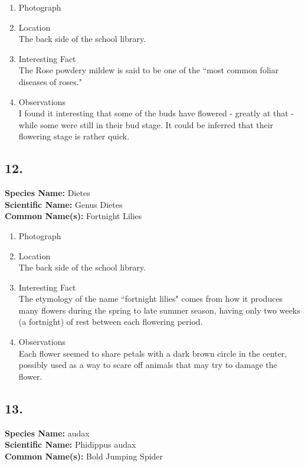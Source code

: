 \documentclass{article}
\begin{document}
\begin{enumerate}[label = \textbf{\arabic*)}]
	\item Photograph

	\item Location \\
		The back side of the school library.
	\item Interesting Fact \\
		The Rose powdery mildew is said to be one of the ``most common foliar diseases of roses."
	\item Observations \\
		I found it interesting that some of the buds have flowered - greatly at that - while some were still in their bud stage. It could be inferred that their flowering stage is rather quick.
\end{enumerate}

\subsection{12.}
\textbf{Species Name: } Dietes \\
\textbf{Scientific Name: } Genus Dietes \\
\textbf{Common Name(s): } Fortnight Lilies

\begin{enumerate}[label = \textbf{\arabic*)}]
	\item Photograph

	\item Location \\
		The back side of the school library.
	\item Interesting Fact \\
		The etymology of the name ``fortnight lilies" comes from how it produces many flowers during the spring to late summer season, having only two weeks (a fortnight) of rest between each flowering period.
	\item Observations \\
		Each flower seemed to share petals with a dark brown circle in the center, possibly used as a way to scare off animals that may try to damage the flower.
\end{enumerate}

\subsection{13.}
\textbf{Species Name: } audax \\
\textbf{Scientific Name: } Phidippus audax \\
\textbf{Common Name(s): } Bold Jumping Spider
\end{document}
